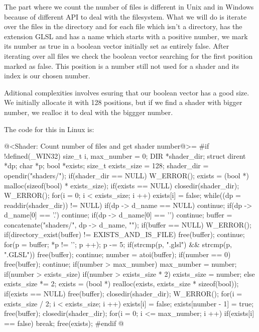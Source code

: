 {The part where we count the number of files is different in Unix and
in Windows because of different API to deal with the filesystem. What
we will do is iterate over the files in the
directory  and for each file which isn't a
directory, has the extension GLSL and has a name which starts with a
positive number, we mark its number as true in a boolean vector
initially set as entirely false. After iterating over all files we
check the boolean vector searching for the first position marked as
false. This position is a number still not used for a shader and its
index is our chosen number.

Aditional complexities involves esuring that our boolean vector has a
good size. We initially allocate it with 128 positions, but if we find
a shader with bigger number, we realloc it to deal with the biggger
number.

The code for this in Linux is:

\iniciocodigo
@<Shader: Count number of files and get shader number@>=
#if !defined(_WIN32)
{
  size_t i, max_number = 0;
  DIR *shader_dir;
  struct dirent *dp;
  char *p;
  bool *exists;
  size_t exists_size = 128;
  shader_dir = opendir("shaders/");
  if(shader_dir == NULL)
    W_ERROR();
  exists = (bool *) malloc(sizeof(bool) * exists_size);
  if(exists == NULL){
    closedir(shader_dir);
    W_ERROR();
  }
  for(i = 0; i < exists_size; i ++)
    exists[i] = false;
  while((dp = readdir(shader_dir)) != NULL){
    if(dp -> d_name == NULL) continue;
    if(dp -> d_name[0] == '.') continue;
    if(dp -> d_name[0] == '\0') continue;
    buffer = concatenate("shaders/", dp -> d_name, "");
    if(buffer == NULL) W_ERROR();
    if(directory_exist(buffer) != EXISTS_AND_IS_FILE){
      free(buffer);
      continue;
    }
    for(p = buffer; *p != '\0'; p ++);
    p -= 5;
    if(strcmp(p, ".glsl") && strcmp(p, ".GLSL")){
      free(buffer);
      continue;
    }
    number = atoi(buffer);
    if(number == 0){
      free(buffer);
      continue;
    }
    if(number > max_number)
      max_number = number;
    if(number > exists_size){
      if(number > exists_size * 2)
        exists_size = number;
      else
        exists_size *= 2;
      exists = (bool *) realloc(exists, exists_size * sizeof(bool));
      if(exists == NULL){
        free(buffer);
        closedir(shader_dir);
        W_ERROR();
      }
      for(i = exists_size / 2; i < exists_size; i ++)
        exists[i] = false;
    }
    exists[number - 1] = true;
    free(buffer);
  }
  closedir(shader_dir);
  for(i = 0; i <= max_number; i ++)
    if(exists[i] == false){
      break;
    }
  free(exists);
}
#endif
@
\fimcodigo

}
